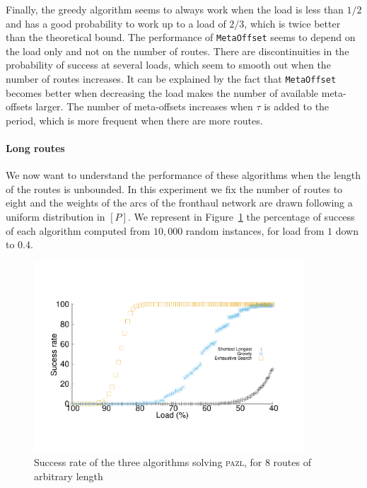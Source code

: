 \documentclass[a4paper,10pt]{journal}
\newcommand\metaoffset{\texttt{MetaOffset}\xspace}
\newcommand\pazl{\textsc{pazl}\xspace}
\begin{document}
      Finally, the greedy algorithm seems to always work when the load is less than $1/2$ and has a good probability to work up to a load of $2/3$, which is twice better than the theoretical bound. The performance of \metaoffset seems to depend on the load only and not on the number of routes. There are discontinuities in the probability of success at several loads, which seem to smooth out when the number of routes increases. It can be explained by the fact that \metaoffset becomes better when decreasing the load makes the number of available meta-offsets larger. The number of meta-offsets increases when $\tau$ is added to the period, which is more frequent when there are more routes.
      
        \paragraph{Long routes}
      
      We now want to understand the performance of these algorithms when the length of the routes is unbounded. In this experiment we fix the number of routes to eight and the weights of the arcs of the fronthaul network are drawn following a uniform distribution in $[P]$. We represent in Figure~\ref{fig:long} the percentage of success of each algorithm computed from $10,000$ random instances, for load from $1$ down to $0.4$.
\begin{figure}[h]

       \begin{center}
      \includegraphics[width=0.9\textwidth]{echec_longues.pdf}
      \end{center}
        
      \caption{Success rate of the three algorithms solving \pazl, for $8$ routes of arbitrary length}\label{fig:long}
     \end{figure}
      
\end{document}
